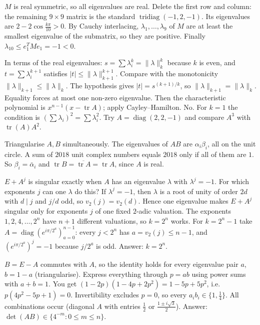 \documentclass[11pt,a4paper]{article}
\begin{document}
\(M\) is real symmetric, so all eigenvalues are real. Delete the first row and column: the remaining \(9\times9\) matrix is the standard \(\operatorname{tridiag}(-1,2,-1)\). Its eigenvalues are \(2-2\cos\frac{k\pi}{10}>0\).
By Cauchy interlacing, \(\lambda_1,\dots,\lambda_9\) of \(M\) are at least the smallest eigenvalue of the submatrix, so they are positive. Finally \(\lambda_{10}\le e_1^TMe_1=-1<0\).

In terms of the real eigenvalues: \(s=\sum\lambda_i^k=\|\lambda\|_k^k\) because \(k\) is even, and \(t=\sum\lambda_i^{k+1}\) satisfies \(|t|\le\|\lambda\|_{k+1}^{k+1}\). Compare with the monotonicity \(\|\lambda\|_{k+1}\le\|\lambda\|_k\).
The hypothesis gives \(|t|=s^{(k+1)/k}\), so \(\|\lambda\|_{k+1}=\|\lambda\|_k\). Equality forces at most one non-zero eigenvalue. Then the characteristic polynomial is \(x^{n-1}(x-\operatorname{tr}A)\); apply Cayley--Hamilton.
No. For \(k=1\) the condition is \((\sum\lambda_i)^2=\sum\lambda_i^2\). Try \(A=\operatorname{diag}(2,2,-1)\) and compare \(A^3\) with \(\operatorname{tr}(A)A^2\).

Triangularise \(A,B\) simultaneously. The eigenvalues of \(AB\) are \(\alpha_i\beta_i\), all on the unit circle.
A sum of \(2018\) unit complex numbers equals \(2018\) only if all of them are \(1\). So \(\beta_i=\bar\alpha_i\) and \(\operatorname{tr}B=\overline{\operatorname{tr}A}=\operatorname{tr}A\), since \(A\) is real.

\(E+A^j\) is singular exactly when \(A\) has an eigenvalue \(\lambda\) with \(\lambda^j=-1\). For which exponents \(j\) can one \(\lambda\) do this?
If \(\lambda^j=-1\), then \(\lambda\) is a root of unity of order \(2d\) with \(d\mid j\) and \(j/d\) odd, so \(v_2(j)=v_2(d)\). Hence one eigenvalue makes \(E+A^j\) singular only for exponents \(j\) of one fixed \(2\)-adic valuation.
The exponents \(1,2,4,\dots,2^n\) have \(n+1\) different valuations, so \(k=2^n\) works. For \(k=2^n-1\) take \(A=\operatorname{diag}(e^{i\pi/2^a})_{a=0}^{n-1}\): every \(j<2^n\) has \(a=v_2(j)\le n-1\), and \((e^{i\pi/2^a})^j=-1\) because \(j/2^a\) is odd. Answer: \(k=2^n\).

\(B=E-A\) commutes with \(A\), so the identity holds for every eigenvalue pair \(a\), \(b=1-a\) (triangularise). Express everything through \(p=ab\) using power sums with \(a+b=1\).
You get \((1-2p)(1-4p+2p^2)=1-5p+5p^2\), i.e.\ \(p(4p^2-5p+1)=0\). Invertibility excludes \(p=0\), so every \(a_ib_i\in\{1,\tfrac14\}\).
All combinations occur (diagonal \(A\) with entries \(\frac12\) or \(\frac{1\pm i\sqrt3}2\)). Answer: \(\det(AB)\in\{4^{-m}: 0\le m\le n\}\).
\end{document}
